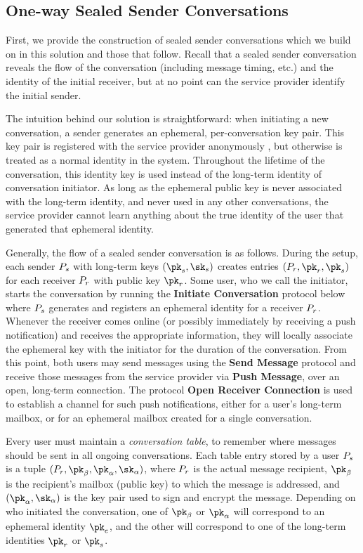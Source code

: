 \subsection{One-way Sealed Sender Conversations}\label{sec:signal-levelonesolution}

First, we provide the construction of sealed sender conversations which we build on in this solution and those that follow.
%
Recall that a sealed sender conversation reveals the flow of the conversation (including message timing, etc.) and the identity of the initial receiver, but at no point can the service provider identify the initial sender.

The intuition behind our solution is straightforward: when initiating a new conversation, a sender generates an ephemeral, per-conversation key pair.  This key pair is registered with the service provider anonymously%
, but otherwise is treated as a normal identity in the system.  Throughout the lifetime of the conversation, this identity key is used instead of the long-term identity of conversation initiator.  As long as the ephemeral public key is never associated with the long-term identity, and never used in any other conversations, the service provider cannot learn anything about the true identity of the user that generated that ephemeral identity.

Generally, the flow of a sealed sender conversation is as follows.  During the setup, each sender $P_s$ with long-term keys $(\pk_s, \sk_s)$  creates entries $(\receiverr, \pk_r, \pk_s)$ for each receiver $P_r$ with public key $\pk_r$.  Some user, who we call the initiator, starts the conversation by running the {\bf Initiate Conversation} protocol below where $P_s$ generates and registers an ephemeral identity for a receiver $P_r$.  Whenever the receiver comes online (or possibly immediately by receiving a push notification) and receives the appropriate information, they will locally associate the ephemeral key with the initiator for the duration of the conversation.  From this point, both users may send messages using the {\bf Send Message} protocol and receive those messages from the service provider via {\bf Push Message}, over an open, long-term connection. 
The protocol {\bf Open Receiver Connection} is used to establish a
channel for such push notifications, either for a user's long-term
mailbox, or for an ephemeral mailbox created for a single conversation.

Every user must maintain a \emph{conversation table}, to remember where
messages should be sent in all ongoing conversations. Each table entry
stored by a user $P_s$ is a tuple
$(\receiverr, \pk_\beta, \pk_\alpha, \sk_\alpha)$, where $P_r$ is the actual
message recipient, $\pk_\beta$ is the recipient's mailbox (public key) to
which the message is addressed, and $(\pk_\alpha, \sk_\alpha)$ is the key pair used
to sign and encrypt the message. Depending on who initiated the
conversation, one of $\pk_\beta$ or $\pk_\alpha$ will correspond to an
ephemeral identity $\pk_e$, and the other will correspond to one of the long-term identities
$\pk_r$ or $\pk_s$.

